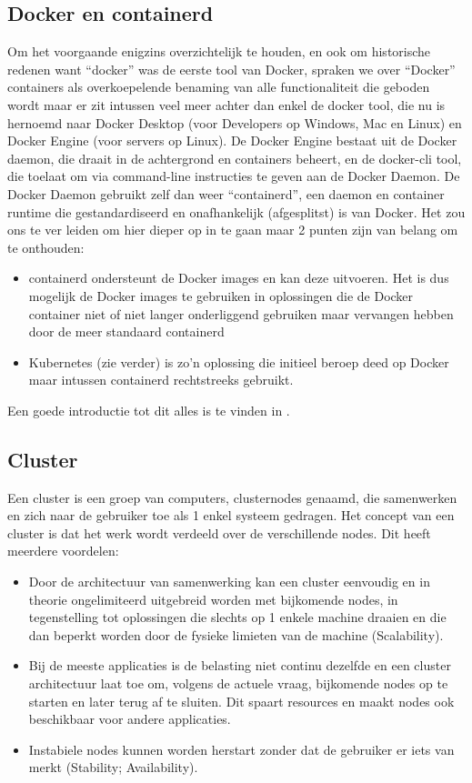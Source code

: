 \subsection{Docker en containerd}
Om het voorgaande enigzins overzichtelijk te houden, en ook om historische redenen want ``docker'' was de eerste tool van Docker, spraken we over ``Docker'' containers als overkoepelende benaming van alle functionaliteit die geboden wordt maar er zit intussen veel meer achter dan enkel de docker tool, die nu is hernoemd naar Docker Desktop (voor Developers op Windows, Mac en Linux) en Docker Engine (voor servers op Linux).
De Docker Engine bestaat uit de Docker daemon, die draait in de achtergrond en containers beheert, en de docker-cli tool, die toelaat om via command-line instructies te geven aan de Docker Daemon.
De Docker Daemon gebruikt zelf dan weer ``containerd'', een daemon en container runtime die gestandardiseerd en onafhankelijk (afgesplitst) is van Docker. Het zou ons te ver leiden om hier dieper op in te gaan maar 2 punten zijn van belang om te onthouden:
\begin{itemize}
    \item containerd ondersteunt de Docker images en kan deze uitvoeren. Het is dus mogelijk de Docker images te gebruiken in oplossingen die de Docker container niet of niet langer onderliggend gebruiken maar vervangen hebben door de meer standaard containerd
    \item Kubernetes (zie verder) is zo'n oplossing die initieel beroep deed op Docker maar intussen containerd rechtstreeks gebruikt.
\end{itemize}

Een goede introductie tot dit alles is te vinden in \textcite{Donohue2023}.


\subsection{Cluster}
Een cluster is een groep van computers, clusternodes genaamd, die samenwerken en zich naar de gebruiker toe als 1 enkel systeem gedragen. Het concept van een cluster is dat het werk wordt verdeeld over de verschillende nodes.
Dit heeft meerdere voordelen:
\newline
\begin{itemize}
    \item Door de architectuur van samenwerking kan een cluster eenvoudig en in theorie ongelimiteerd uitgebreid worden met bijkomende nodes, in tegenstelling tot oplossingen die slechts op 1 enkele machine draaien en die dan beperkt worden door de fysieke limieten van de machine (Scalability).
    \item Bij de meeste applicaties is de belasting niet continu dezelfde en een cluster architectuur laat toe om, volgens de actuele vraag, bijkomende nodes op te starten en later terug af te sluiten. Dit spaart resources en maakt nodes ook beschikbaar voor andere applicaties.
    \item Instabiele nodes kunnen worden herstart zonder dat de gebruiker er iets van merkt (Stability; Availability).
\end{itemize}

